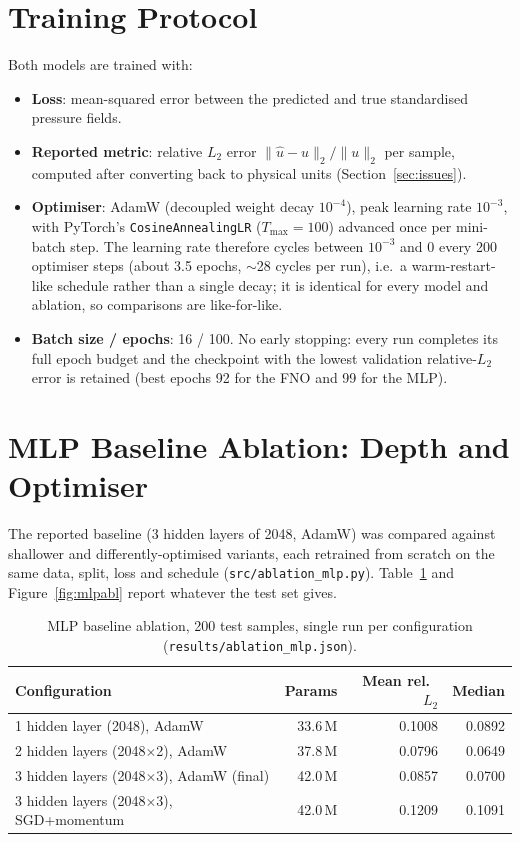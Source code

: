 \documentclass[11pt,a4paper]{article}
\begin{document}
\section{Training Protocol}

Both models are trained with:
\begin{itemize}[nosep]
  \item \textbf{Loss}: mean-squared error between the predicted and true standardised pressure fields.
  \item \textbf{Reported metric}: relative $L_2$ error $\|{\hat{u} - u}\|_2 / \|{u}\|_2$ per sample, computed after converting back to physical units (Section~\ref{sec:issues}).
  \item \textbf{Optimiser}: AdamW (decoupled weight decay $10^{-4}$), peak learning rate $10^{-3}$, with PyTorch's \texttt{CosineAnnealingLR} ($T_{\max}=100$) advanced once per mini-batch step. The learning rate therefore cycles between $10^{-3}$ and $0$ every 200 optimiser steps (about 3.5 epochs, $\sim$28 cycles per run), i.e.\ a warm-restart-like schedule rather than a single decay; it is identical for every model and ablation, so comparisons are like-for-like.
  \item \textbf{Batch size / epochs}: 16 / 100. No early stopping: every run completes its full epoch budget and the checkpoint with the lowest validation relative-$L_2$ error is retained (best epochs 92 for the FNO and 99 for the MLP).
\end{itemize}

\section{MLP Baseline Ablation: Depth and Optimiser}
\label{sec:mlpabl}
The reported baseline (3 hidden layers of 2048, AdamW) was compared against shallower and differently-optimised variants, each retrained from scratch on the same data, split, loss and schedule (\texttt{src/ablation\_mlp.py}). Table~\ref{tab:mlpabl} and Figure~\ref{fig:mlpabl} report whatever the test set gives.

\begin{table}[H]
\centering
\caption{MLP baseline ablation, 200 test samples, single run per configuration (\texttt{results/ablation\_mlp.json}).}
\label{tab:mlpabl}
\begin{tabular}{lrrr}
\toprule
Configuration & Params & Mean rel.\ $L_2$ & Median \\
\midrule
1 hidden layer (2048), AdamW                 & 33.6\,M & 0.1008 & 0.0892 \\
2 hidden layers (2048$\times$2), AdamW        & 37.8\,M & 0.0796 & 0.0649 \\
3 hidden layers (2048$\times$3), AdamW (final) & 42.0\,M & 0.0857 & 0.0700 \\
3 hidden layers (2048$\times$3), SGD+momentum  & 42.0\,M & 0.1209 & 0.1091 \\
\bottomrule
\end{tabular}
\end{table}
\end{document}
